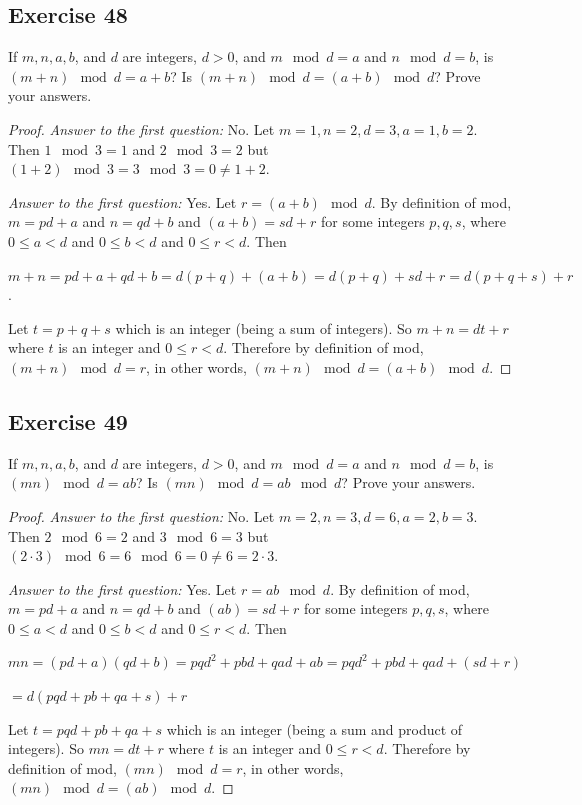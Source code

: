 \documentclass[14pt]{extarticle}
\begin{document}
\subsection{Exercise 48}
If $m, n, a, b$, and $d$ are integers, $d > 0$, and $m \mod d = a$ and $n \mod d = b$, is $(m + n) \mod d = a + b$? Is $(m + n) \mod d = (a + b) \mod d$? Prove your answers.

\begin{proof}
{\it Answer to the first question:} No. Let $m = 1, n = 2, d = 3, a = 1, b = 2$. Then $1 \mod 3 = 1$ and $2 \mod 3 = 2$ but $(1+2) \mod 3 = 3 \mod 3 = 0 \neq 1+2$.

{\it Answer to the first question:} Yes. Let $r = (a+b) \mod d$. By definition of mod, $m = pd+a$ and $n = qd+b$ and $(a+b) = sd+r$ for some integers $p,q,s$, where $0 \leq a < d$ and $0 \leq b < d$ and $0 \leq r < d$. Then 

$m+n = pd+a+qd+b = d(p+q)+(a+b) = d(p+q) + sd+r = d(p+q+s)+r$.

Let $t = p+q+s$ which is an integer (being a sum of integers). So $m+n = dt + r$ where $t$ is an integer and $0 \leq r < d$. Therefore by definition of mod, $(m+n) \mod d = r$, in other words, $(m + n) \mod d = (a + b) \mod d$.
\end{proof}

\subsection{Exercise 49}
If $m, n, a, b$, and $d$ are integers, $d > 0$, and $m \mod d = a$ and $n \mod d = b$, is $(mn) \mod d = ab$? Is $(mn) \mod d = ab \mod d$? Prove your answers.

\begin{proof}
{\it Answer to the first question:} No. Let $m = 2, n = 3, d = 6, a = 2, b = 3$. Then $2 \mod 6 = 2$ and $3 \mod 6 = 3$ but $(2\cdot3) \mod 6 = 6 \mod 6 = 0 \neq 6 = 2\cdot3$.

{\it Answer to the first question:} Yes. Let $r = ab \mod d$. By definition of mod, $m = pd+a$ and $n = qd+b$ and $(ab) = sd+r$ for some integers $p,q,s$, where $0 \leq a < d$ and $0 \leq b < d$ and $0 \leq r < d$. Then 

$mn = (pd+a)(qd+b) = pqd^2 + pbd + qad + ab = pqd^2 + pbd + qad + (sd + r)$

$ = d(pqd+pb+qa+s) + r$

Let $t = pqd+pb+qa+s$ which is an integer (being a sum and product of integers). So $mn = dt + r$ where $t$ is an integer and $0 \leq r < d$. Therefore by definition of mod, $(mn) \mod d = r$, in other words, $(mn) \mod d = (ab) \mod d$.
\end{proof}
\end{document}
